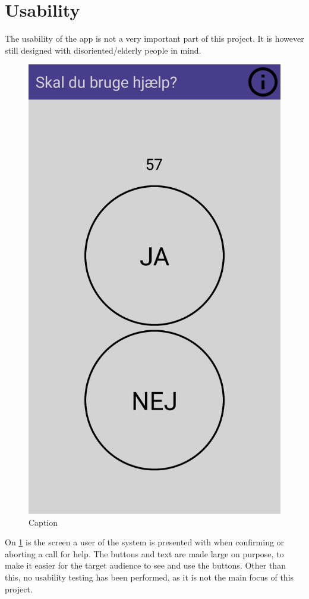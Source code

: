 \section{Usability}
The usability of the app is not a very important part of this project. It is however still designed with disoriented/elderly people in mind. 

\begin{figure}
    \centering
    \includegraphics[scale=0.1]{Figures/usabapp.png}
    \caption{Caption}
    \label{fig:usabapp}
\end{figure}


On \ref{fig:usabapp} is the screen a user of the system is presented with when confirming or aborting a call for help. The buttons and text are made large on purpose, to make it easier for the target audience to see and use the buttons. Other than this, no usability testing has been performed, as it is not the main focus of this project.